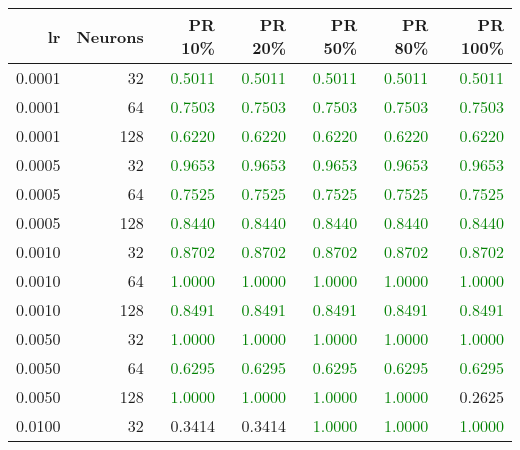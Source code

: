 \begin{tabular}{rrrrrrr}
\toprule
lr & Neurons & PR 10\% & PR 20\% & PR 50\% & PR 80\% & PR 100\% \\
\midrule
0.0001 & 32 & \textcolor{green} {0.5011} & \textcolor{green} {0.5011} & \textcolor{green} {0.5011} & \textcolor{green} {0.5011} & \textcolor{green} {0.5011} \\
0.0001 & 64 & \textcolor{green} {0.7503} & \textcolor{green} {0.7503} & \textcolor{green} {0.7503} & \textcolor{green} {0.7503} & \textcolor{green} {0.7503} \\
0.0001 & 128 & \textcolor{green} {0.6220} & \textcolor{green} {0.6220} & \textcolor{green} {0.6220} & \textcolor{green} {0.6220} & \textcolor{green} {0.6220} \\
0.0005 & 32 & \textcolor{green} {0.9653} & \textcolor{green} {0.9653} & \textcolor{green} {0.9653} & \textcolor{green} {0.9653} & \textcolor{green} {0.9653} \\
0.0005 & 64 & \textcolor{green} {0.7525} & \textcolor{green} {0.7525} & \textcolor{green} {0.7525} & \textcolor{green} {0.7525} & \textcolor{green} {0.7525} \\
0.0005 & 128 & \textcolor{green} {0.8440} & \textcolor{green} {0.8440} & \textcolor{green} {0.8440} & \textcolor{green} {0.8440} & \textcolor{green} {0.8440} \\
0.0010 & 32 & \textcolor{green} {0.8702} & \textcolor{green} {0.8702} & \textcolor{green} {0.8702} & \textcolor{green} {0.8702} & \textcolor{green} {0.8702} \\
0.0010 & 64 & \textcolor{green} {1.0000} & \textcolor{green} {1.0000} & \textcolor{green} {1.0000} & \textcolor{green} {1.0000} & \textcolor{green} {1.0000} \\
0.0010 & 128 & \textcolor{green} {0.8491} & \textcolor{green} {0.8491} & \textcolor{green} {0.8491} & \textcolor{green} {0.8491} & \textcolor{green} {0.8491} \\
0.0050 & 32 & \textcolor{green} {1.0000} & \textcolor{green} {1.0000} & \textcolor{green} {1.0000} & \textcolor{green} {1.0000} & \textcolor{green} {1.0000} \\
0.0050 & 64 & \textcolor{green} {0.6295} & \textcolor{green} {0.6295} & \textcolor{green} {0.6295} & \textcolor{green} {0.6295} & \textcolor{green} {0.6295} \\
0.0050 & 128 & \textcolor{green} {1.0000} & \textcolor{green} {1.0000} & \textcolor{green} {1.0000} & \textcolor{green} {1.0000} & \textcolor{blu} {0.2625} \\
0.0100 & 32 & \textcolor{blu} {0.3414} & \textcolor{blu} {0.3414} & \textcolor{green} {1.0000} & \textcolor{green} {1.0000} & \textcolor{green} {1.0000} \\

\end{tabular}
